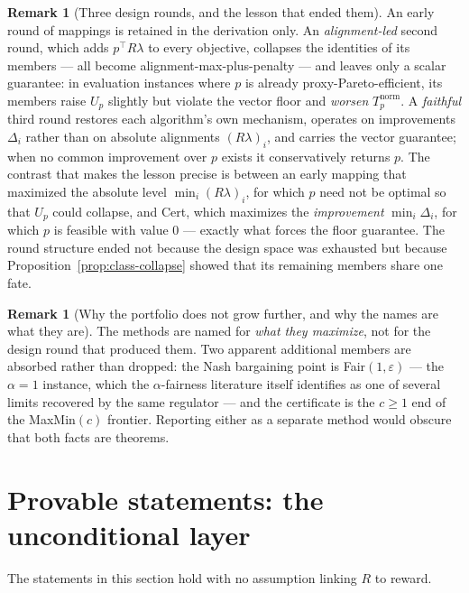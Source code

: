 \documentclass[12pt,a4paper]{report}
\newcommand{\1}{\mathbf{1}}
\theoremstyle{definition}
\newtheorem{remark}[definition]{Remark}
\begin{document}
\begin{remark}[Three design rounds, and the lesson that ended them]
\label{rem:design-rounds}
An early round of mappings is retained in the derivation only. An \emph{alignment-led} second round, which adds \(p^\top R\lambda\) to every objective, collapses the identities of its members --- all become alignment-max-plus-penalty --- and leaves only a scalar guarantee: in evaluation instances where \(p\) is already proxy-Pareto-efficient, its members raise \(U_p\) slightly but violate the vector floor and \emph{worsen} \(T_p^{\mathrm{norm}}\). A \emph{faithful} third round restores each algorithm's own mechanism, operates on improvements \(\Delta_i\) rather than on absolute alignments \((R\lambda)_i\), and carries the vector guarantee; when no common improvement over \(p\) exists it conservatively returns \(p\). The contrast that makes the lesson precise is between an early mapping that maximized the absolute level \(\min_i(R\lambda)_i\), for which \(p\) need not be optimal so that \(U_p\) could collapse, and Cert, which maximizes the \emph{improvement} \(\min_i\Delta_i\), for which \(p\) is feasible with value \(0\) --- exactly what forces the floor guarantee. The round structure ended not because the design space was exhausted but because Proposition~\ref{prop:class-collapse} showed that its remaining members share one fate.
\end{remark}

\begin{remark}[Why the portfolio does not grow further, and why the names are what they are]
\label{rem:portfolio-closed}
The methods are named for \emph{what they maximize}, not for the design round that produced them. Two apparent additional members are absorbed rather than dropped: the Nash bargaining point is Fair\((1,\varepsilon)\) --- the \(\alpha=1\) instance, which the \(\alpha\)-fairness literature itself identifies as one of several limits recovered by the same regulator \citep{ban2024fairgrad,navon2022nashmtl} --- and the certificate is the \(c\ge1\) end of the MaxMin\((c)\) frontier. Reporting either as a separate method would obscure that both facts are theorems.
\end{remark}

\section{Provable statements: the unconditional layer}
\label{sec:unconditional}

The statements in this section hold with no assumption linking \(R\) to reward.
\end{document}
